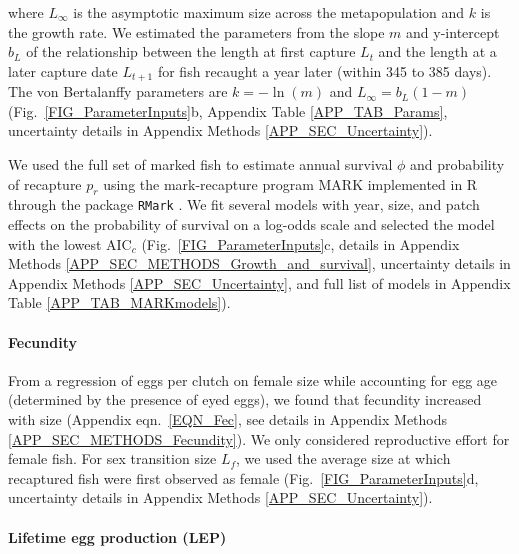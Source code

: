 \documentclass[12pt, oneside]{article}   	%
\begin{document}
where $L_\infty$ is the asymptotic maximum size across the metapopulation and $k$ is the growth rate. We estimated the parameters from the slope $m$ and y-intercept $b_L$ of the relationship between the length at first capture $L_t$ and the length at a later capture date $L_{t+1}$ for fish recaught a year later (within 345 to 385 days). The von Bertalanffy parameters are $k = -\ln(m)$ and $L_\infty = b_L(1-m)$ \citep{hart2009estimating} (Fig.\ \ref{FIG_ParameterInputs}b, Appendix Table \ref{APP_TAB_Params}, uncertainty details in Appendix Methods \ref{APP_SEC_Uncertainty}).

We used the full set of marked fish to estimate annual survival $\phi$ and probability of recapture $p_r$ using the mark-recapture program MARK implemented in R through the package \texttt{RMark} \citep{RMark_Laake2013}. We fit several models with year, size, and patch effects on the probability of survival on a log-odds scale and selected the model with the lowest $\text{AIC}_c$ (Fig.\ \ref{FIG_ParameterInputs}c, details in Appendix Methods \ref{APP_SEC_METHODS_Growth_and_survival}, uncertainty details in Appendix Methods \ref{APP_SEC_Uncertainty}, and full list of models in Appendix Table \ref{APP_TAB_MARKmodels}). 

\paragraph*{Fecundity}

From a regression of eggs per clutch on female size while accounting for egg age (determined by the presence of eyed eggs), we found that fecundity increased with size (Appendix eqn.\ \ref{EQN_Fec}, see details in Appendix Methods \ref{APP_SEC_METHODS_Fecundity}). We only considered reproductive effort for female fish. For sex transition size $L_f$, we used the average size at which recaptured fish were first observed as female (Fig.\ \ref{FIG_ParameterInputs}d, uncertainty details in Appendix Methods \ref{APP_SEC_Uncertainty}).

\paragraph*{Lifetime egg production (LEP)}
\end{document}
